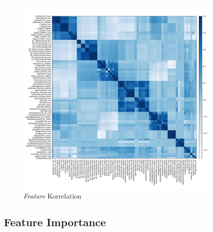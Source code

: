\begin{figure}[htbp]
  \centering
  \includegraphics[width=0.9\textwidth]{images/feature_correlation.png}
  \caption{\textit{Feature} Korrelation}
  \label{fig:feature_correlation}
\end{figure}

\subsection{Feature Importance}
\label{sec:feature_importance}

